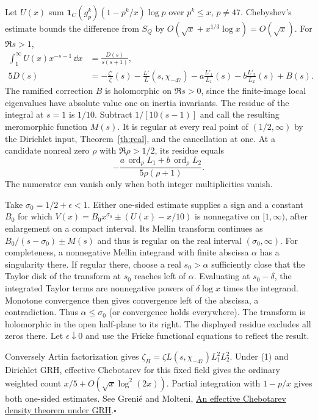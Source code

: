 Let $U(x)$ sum $\mathbf 1_C(g_p^k)(1-p^k/x)\log p$ over $p^k\le x$, $p\ne47$. Chebyshev's estimate bounds the difference from $S_Q$ by $O(\sqrt x+x^{1/3}\log x)=O(\sqrt x)$. For $\Re s>1$,
\begin{align*}
 \int_1^\infty U(x)x^{-s-1}\,\dd x
 &=\frac{D(s)}{s(s+1)},\\
 5D(s)&=-\frac{\zeta'}\zeta(s)-\frac{L'}L(s,\chi_{-47})
         -a\frac{L'_1}{L_1}(s)-b\frac{L'_2}{L_2}(s)+B(s).
\end{align*}
The ramified correction $B$ is holomorphic on $\Re s>0$, since the finite-image local eigenvalues have absolute value one on inertia invariants. The residue of the integral at $s=1$ is $1/10$. Subtract $1/[10(s-1)]$ and call the resulting meromorphic function $M(s)$. It is regular at every real point of $(1/2,\infty)$ by the Dirichlet input, Theorem~\ref{th:real}, and the cancellation at one. At a candidate nonreal zero $\rho$ with $\Re\rho>1/2$, its residue equals
\[
     -\frac{a\,\operatorname{ord}_\rho L_1+b\,\operatorname{ord}_\rho L_2}
            {5\rho(\rho+1)} .
\]
The numerator can vanish only when both integer multiplicities vanish.

Take $\sigma_0=1/2+\epsilon<1$. Either one-sided estimate supplies a sign and a constant $B_0$ for which
$V(x)=B_0x^{\sigma_0}\pm (U(x)-x/10)$ is nonnegative on $[1,\infty)$, after enlargement on a compact interval. Its Mellin transform continues as $B_0/(s-\sigma_0)\pm M(s)$ and thus is regular on the real interval $(\sigma_0,\infty)$. For completeness, a nonnegative Mellin integrand with finite abscissa $\alpha$ has a singularity there. If regular there, choose a real $s_0>\alpha$ sufficiently close that the Taylor disk of the transform at $s_0$ reaches left of $\alpha$. Evaluating at $s_0-\delta$, the integrated Taylor terms are nonnegative powers of $\delta\log x$ times the integrand. Monotone convergence then gives convergence left of the abscissa, a contradiction. Thus $\alpha\le\sigma_0$ (or convergence holds everywhere). The transform is holomorphic in the open half-plane to its right. The displayed residue excludes all zeros there. Let $\epsilon\downarrow0$ and use the Fricke functional equations to reflect the result.

Conversely Artin factorization gives $\zeta_H=\zeta L(s,\chi_{-47})L_1^2L_2^2$. Under (1) and Dirichlet GRH, effective Chebotarev for this fixed field gives the ordinary weighted count $x/5+O(\sqrt x\log^2(2x))$. Partial integration with $1-p/x$ gives both one-sided estimates. See Greni\'e and Molteni, \href{https://arxiv.org/abs/1709.07609}{An effective Chebotarev density theorem under GRH}.\hfill$\square$

